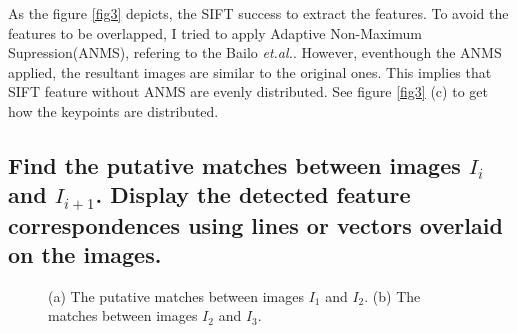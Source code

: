 \documentclass[10pt]{article}
\begin{document}
As the figure \ref{fig3} depicts, the SIFT success to extract the features. To avoid the features to be overlapped, I tried to apply Adaptive Non-Maximum Supression(ANMS), refering to the Bailo \textit{et.al.}\cite{bailo2018efficient}.
However, eventhough the ANMS applied, the resultant images are similar to the original ones. 
This implies that SIFT feature without ANMS are evenly distributed. See figure \ref{fig3} (c) to get how the keypoints are distributed.

\subsection*{Find the putative matches between images $I_i$ and $I_{i+1}$. Display the detected feature correspondences using lines or vectors overlaid on the
images.}

\begin{figure}[!h]
    \begin{center}
    \end{center}
    \caption{(a) The putative matches between images $I_1$ and $I_2$. (b) The matches between images $I_2$ and $I_3$.}
    \label{fig4}
\end{figure}
\end{document}
